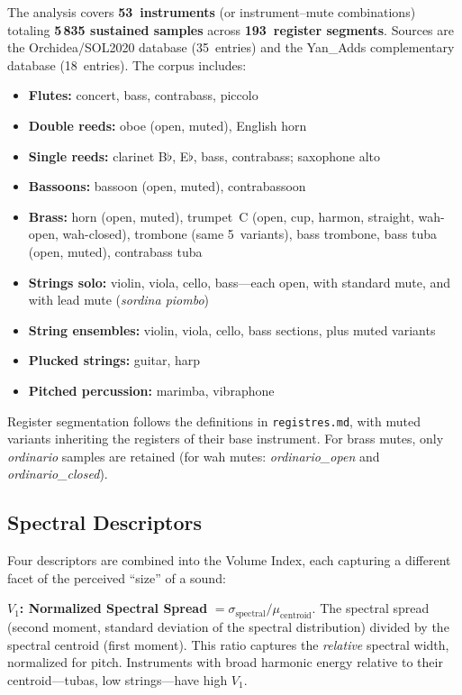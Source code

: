 \documentclass[journal]{IEEEtran}
\begin{document}
The analysis covers \textbf{53~instruments} (or instrument--mute combinations) totaling \textbf{5\,835 sustained samples} across \textbf{193~register segments}. Sources are the Orchidea/SOL2020 database (35~entries) and the Yan\_Adds complementary database (18~entries). The corpus includes:

\begin{itemize}[nosep]
\item \textbf{Flutes:} concert, bass, contrabass, piccolo
\item \textbf{Double reeds:} oboe (open, muted), English horn
\item \textbf{Single reeds:} clarinet B$\flat$, E$\flat$, bass, contrabass; saxophone alto
\item \textbf{Bassoons:} bassoon (open, muted), contrabassoon
\item \textbf{Brass:} horn (open, muted), trumpet~C (open, cup, harmon, straight, wah-open, wah-closed), trombone (same 5~variants), bass trombone, bass tuba (open, muted), contrabass tuba
\item \textbf{Strings solo:} violin, viola, cello, bass---each open, with standard mute, and with lead mute (\textit{sordina piombo})
\item \textbf{String ensembles:} violin, viola, cello, bass sections, plus muted variants
\item \textbf{Plucked strings:} guitar, harp
\item \textbf{Pitched percussion:} marimba, vibraphone
\end{itemize}

Register segmentation follows the definitions in \texttt{registres.md}, with muted variants inheriting the registers of their base instrument. For brass mutes, only \textit{ordinario} samples are retained (for wah mutes: \textit{ordinario\_open} and \textit{ordinario\_closed}).

\subsection{Spectral Descriptors}

Four descriptors are combined into the Volume Index, each capturing a different facet of the perceived ``size'' of a sound:

\textbf{$V_1$: Normalized Spectral Spread} $= \sigma_\text{spectral} / \mu_\text{centroid}$. The spectral spread (second moment, standard deviation of the spectral distribution) divided by the spectral centroid (first moment). This ratio captures the \emph{relative} spectral width, normalized for pitch. Instruments with broad harmonic energy relative to their centroid---tubas, low strings---have high $V_1$.
\end{document}
